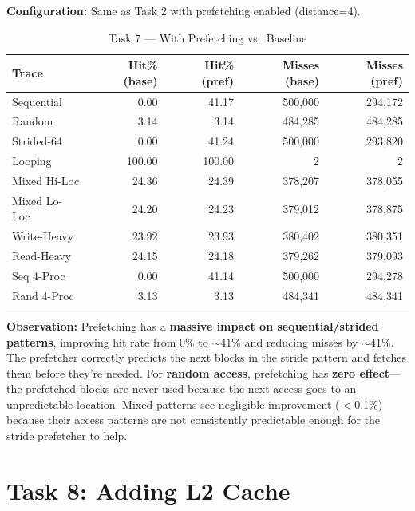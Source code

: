 \documentclass[12pt,a4paper]{article}
\begin{document}
\textbf{Configuration:} Same as Task 2 with prefetching enabled (distance=4).

\begin{table}[H]
\centering
\caption{Task 7 --- With Prefetching vs.\ Baseline}
\begin{tabular}{lrr|rr}
\toprule
\textbf{Trace} & \textbf{Hit\% (base)} & \textbf{Hit\% (pref)} & \textbf{Misses (base)} & \textbf{Misses (pref)} \\
\midrule
Sequential     & 0.00  & 41.17 & 500,000 & 294,172 \\
Random         & 3.14  & 3.14  & 484,285 & 484,285 \\
Strided-64     & 0.00  & 41.24 & 500,000 & 293,820 \\
Looping        & 100.00& 100.00& 2       & 2       \\
Mixed Hi-Loc   & 24.36 & 24.39 & 378,207 & 378,055 \\
Mixed Lo-Loc   & 24.20 & 24.23 & 379,012 & 378,875 \\
Write-Heavy    & 23.92 & 23.93 & 380,402 & 380,351 \\
Read-Heavy     & 24.15 & 24.18 & 379,262 & 379,093 \\
Seq 4-Proc     & 0.00  & 41.14 & 500,000 & 294,278 \\
Rand 4-Proc    & 3.13  & 3.13  & 484,341 & 484,341 \\
\bottomrule
\end{tabular}
\end{table}

\textbf{Observation:} Prefetching has a \textbf{massive impact on sequential/strided patterns}, improving hit rate from 0\% to $\sim$41\% and reducing misses by $\sim$41\%. The prefetcher correctly predicts the next blocks in the stride pattern and fetches them before they're needed. For \textbf{random access}, prefetching has \textbf{zero effect}---the prefetched blocks are never used because the next access goes to an unpredictable location. Mixed patterns see negligible improvement ($<$0.1\%) because their access patterns are not consistently predictable enough for the stride prefetcher to help.

\section{Task 8: Adding L2 Cache}
\end{document}
